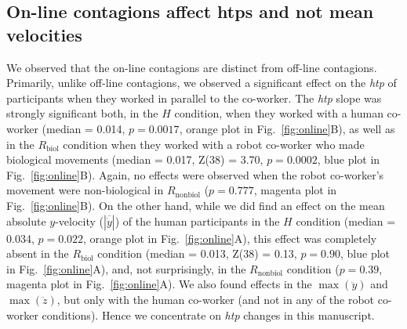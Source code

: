 \subsection{On-line contagions affect htps and not mean velocities}

We observed that the on-line contagions are distinct from off-line contagions. Primarily, unlike off-line contagions, we observed a significant effect on the {\it htp} of participants when they worked in parallel to the co-worker. The {\it htp} slope was strongly significant both, in the $H$ condition, when they worked with a human co-worker (median = 0.014, $p = 0.0017$, orange plot in Fig.~\ref{fig:online}B), as well as in the $R_{\text{biol}}$ condition when they worked with a robot co-worker who made biological movements (median = 0.017, Z(38) = 3.70, $p = 0.0002$, blue plot in Fig.~\ref{fig:online}B). Again, no effects were observed when the robot co-worker's movement were non-biological in $R_{\text{nonbiol}}$ ($p = 0.777$, magenta plot in Fig.~\ref{fig:online}B). On the other hand, while we did find an effect on the mean absolute $y$-velocity ($|\overline{\dot{y}}|$) of the human participants in the $H$ condition (median = 0.034, $p = 0.022$, orange plot in Fig.~\ref{fig:online}A), this effect was completely absent in the $R_{\text{biol}}$ condition (median = 0.013, Z(38) = 0.13, $p = 0.90$, blue plot in Fig.~\ref{fig:online}A), and, not surprisingly, in the $R_{\text{nonbiol}}$ condition ($p = 0.39$, magenta plot in Fig.~\ref{fig:online}A). We also found effects in the $\max(\ddot{y})$ and $\max(\ddot{z})$, but only with the human co-worker (and not in any of the robot co-worker conditions). Hence we concentrate on {\it htp} changes in this manuscript.


